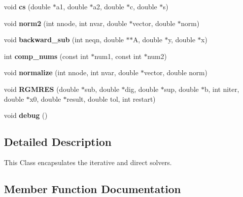 \begin{DoxyCompactItemize}
void {\bfseries cs} (double $\ast$a1, double $\ast$a2, double $\ast$c, double $\ast$s)
\item 
\mbox{\label{classTridiag_a1122fc55573d0e3d21ecef7810709505}} 
void {\bfseries norm2} (int nnode, int nvar, double $\ast$vector, double $\ast$norm)
\item 
\mbox{\label{classTridiag_a4e92ab9f3beeedd1b4fc1c2431e9978c}} 
void {\bfseries backward\+\_\+sub} (int neqn, double $\ast$$\ast$A, double $\ast$y, double $\ast$x)
\item 
\mbox{\label{classTridiag_a58b330bb74780ba611139724aee17563}} 
int {\bfseries comp\+\_\+nums} (const int $\ast$num1, const int $\ast$num2)
\item 
\mbox{\label{classTridiag_a2949d8b5c9abd6e17cc8ec4e7699fb5b}} 
void {\bfseries normalize} (int nnode, int nvar, double $\ast$vector, double norm)
\item 
\mbox{\label{classTridiag_a437730c60c4601a981f5f9a76b200aa7}} 
void {\bfseries R\+G\+M\+R\+ES} (double $\ast$sub, double $\ast$dig, double $\ast$sup, double $\ast$b, int niter, double $\ast$x0, double $\ast$result, double tol, int restart)
\item 
\mbox{\label{classTridiag_ab2b479ee14892313e489cb26919505bf}} 
void {\bfseries debug} ()
\end{DoxyCompactItemize}


\subsection{Detailed Description}
This Class encapsulates the iterative and direct solvers. 

\subsection{Member Function Documentation}
\mbox{\label{classTridiag_a90777148984f7504ab69469c84129204}} 
